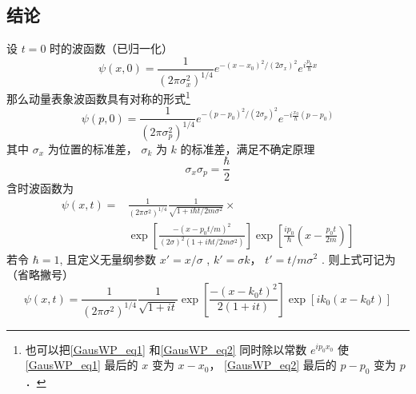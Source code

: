 


\subsection{结论}
设 $t = 0$ 时的波函数（已归一化）
\begin{equation}\label{GausWP_eq1}
\psi (x,0) = \frac{1}{{{{(2\pi {\sigma_x ^2})}^{1/4}}}}{e^{ - {{(x - {x_0})}^2}/{{(2\sigma_x )}^2}}}{e^{i\frac{p_0}{\hbar}x}}
\end{equation}
那么动量表象波函数具有对称的形式\footnote{也可以把\autoref{GausWP_eq1} 和\autoref{GausWP_eq2} 同时除以常数 $e^{i p_0 x_0}$ 使\autoref{GausWP_eq1} 最后的 $x$ 变为 $x-x_0$， \autoref{GausWP_eq2} 最后的 $p-p_0$ 变为 $p$． }
\begin{equation}\label{GausWP_eq2}
\psi (p,0) = \frac{1}{{{{(2\pi \sigma _p^2)}^{1/4}}}}{e^{ - {{(p - {p_0})}^2}/{{(2{\sigma _p})}^2}}}{e^{ - i\frac{{{x_0}}}{\hbar }(p - {p_0})}}
\end{equation}
其中 $\sigma_x$ 为位置的标准差， $\sigma_k$ 为 $k$ 的标准差，满足不确定原理
\begin{equation}
\sigma_x\sigma_p = \frac{\hbar}{2}
\end{equation}
含时波函数为
\begin{equation}\begin{aligned}
\psi (x,t) = &\frac{1}{{{{(2\pi {\sigma ^2})}^{1/4}}}}\frac{1}{{\sqrt {1 + i\hbar t/2m{\sigma ^2}} }}\times\\
&\exp \left[ {\frac{{ - {{(x - {p_0}t/m)}^2}}}{{{{(2\sigma )}^2}(1 + i\hbar t/2m{\sigma ^2})}}} \right]\exp \left[ {\frac{{i{p_0}}}{\hbar }\left( {x - \frac{{{p_0}t}}{{2m}}} \right)} \right]
\end{aligned}\end{equation}
若令 $\hbar  = 1$, 且定义无量纲参数 $x' = x/\sigma$ ,  $k' = \sigma k$， $t' = t/m\sigma^2$  . 则上式可记为（省略撇号）
\begin{equation}
\psi (x,t) = \frac{1}{{{{(2\pi {\sigma ^2})}^{1/4}}}}\frac{1}{{\sqrt {1 + it} }}\exp \left[ {\frac{{ - {{(x - {k_0}t)}^2}}}{{2(1 + it)}}} \right]\exp \left[ {i{k_0}(x - {k_0}t)} \right]
\end{equation}

